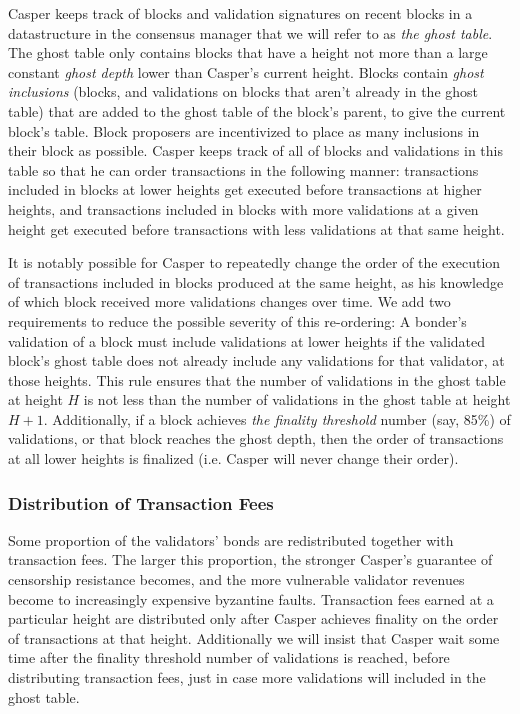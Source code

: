 \documentclass[11pt,a4paper]{article}
\begin{document}
Casper keeps track of blocks and validation signatures on recent blocks in a datastructure in the consensus manager that we will refer to as \emph{the ghost table}. The ghost table only contains blocks that have a height not more than a large constant \emph{ghost depth} lower than Casper's current height. Blocks contain \emph{ghost inclusions} (blocks, and validations on blocks that aren't already in the ghost table) that are added to the ghost table of the block's parent, to give the current block's table. Block proposers are incentivized to place as many inclusions in their block as possible. Casper keeps track of all of blocks and validations in this table so that he can order transactions in the following manner: transactions included in blocks at lower heights get executed before transactions at higher heights, and transactions included in blocks with more validations at a given height get executed before transactions with less validations at that same height.

It is notably possible for Casper to repeatedly change the order of the execution of transactions included in blocks produced at the same height, as his knowledge of which block received more validations changes over time. We add two requirements to reduce the possible severity of this re-ordering: A bonder's validation of a block must include validations at lower heights if the validated block's ghost table does not already include any validations for that validator, at those heights. This rule ensures that the number of validations in the ghost table at height $H$ is not less than the number of validations in the ghost table at height $H + 1$. Additionally, if a block achieves \emph{the finality threshold} number (say, 85\%) of validations, or that block reaches the ghost depth, then the order of transactions at all lower heights is finalized (i.e. Casper will never change their order).


\subsubsection{Distribution of Transaction Fees}

Some proportion of the validators' bonds are redistributed together with transaction fees. The larger this proportion, the stronger Casper's guarantee of censorship resistance becomes, and the more vulnerable validator revenues become to increasingly expensive byzantine faults. Transaction fees earned at a particular height are distributed only after Casper achieves finality on the order of transactions at that height. Additionally we will insist that Casper wait some time after the finality threshold number of validations is reached, before distributing transaction fees, just in case more validations will included in the ghost table.
\end{document}
